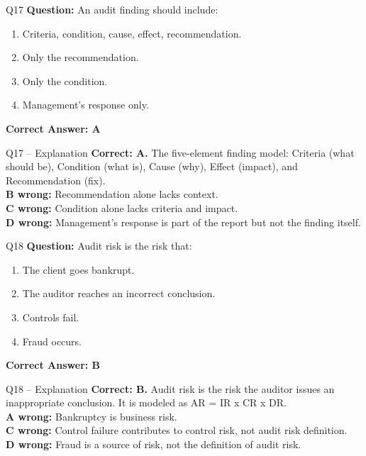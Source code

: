 \documentclass[aspectratio=169,10pt]{beamer}
\begin{document}
	\begin{frame}[t]{Q17}
		\small
		\textbf{Question:} An audit finding should include:
		\begin{enumerate}[label=\Alph*.,itemsep=1pt,topsep=2pt]
			\item Criteria, condition, cause, effect, recommendation.
			\item Only the recommendation.
			\item Only the condition.
			\item Management's response only.
		\end{enumerate}
		\vspace{4pt}
		\textbf{Correct Answer: A}
	\end{frame}
	
	\begin{frame}[t]{Q17 -- Explanation}
		\small
		\textbf{Correct: A.} The five-element finding model: Criteria (what should be), Condition (what is), Cause (why), Effect (impact), and Recommendation (fix). \\[4pt]
		\textbf{B wrong:} Recommendation alone lacks context. \\[2pt]
		\textbf{C wrong:} Condition alone lacks criteria and impact. \\[2pt]
		\textbf{D wrong:} Management's response is part of the report but not the finding itself.
	\end{frame}
	
	\begin{frame}[t]{Q18}
		\small
		\textbf{Question:} Audit risk is the risk that:
		\begin{enumerate}[label=\Alph*.,itemsep=1pt,topsep=2pt]
			\item The client goes bankrupt.
			\item The auditor reaches an incorrect conclusion.
			\item Controls fail.
			\item Fraud occurs.
		\end{enumerate}
		\vspace{4pt}
		\textbf{Correct Answer: B}
	\end{frame}
	
	\begin{frame}[t]{Q18 -- Explanation}
		\small
		\textbf{Correct: B.} Audit risk is the risk the auditor issues an inappropriate conclusion. It is modeled as AR = IR x CR x DR. \\[4pt]
		\textbf{A wrong:} Bankruptcy is business risk. \\[2pt]
		\textbf{C wrong:} Control failure contributes to control risk, not audit risk definition. \\[2pt]
		\textbf{D wrong:} Fraud is a source of risk, not the definition of audit risk.
	\end{frame}
	
\end{document}
